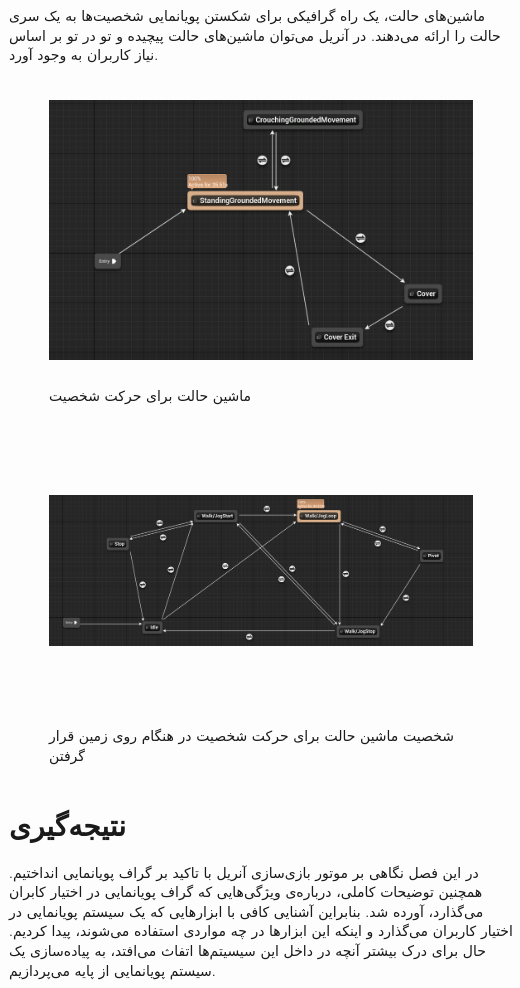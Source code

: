 ماشین‌های حالت، یک راه گرافیکی برای شکستن پویانمایی 
شخصیت‌ها به یک سری حالت را ارائه می‌دهند.
در آنریل می‌توان ماشین‌های حالت پیچیده و تو در تو بر اساس نیاز کاربران به وجود آورد.


\begin{figure}[ht]
	\centerline{\includegraphics[width=\textwidth,height=8cm,keepaspectratio]{Figures/Ch3/AnimationStateMachine1.png}}\hfill
	\caption{ ماشین حالت برای حرکت شخصیت }
	\label{fig:AnimationStateMachine1}
\end{figure}

\begin{figure}[ht]
	\centerline{\includegraphics[width=\textwidth,height=8cm,keepaspectratio]{Figures/Ch3/AnimationStateMachine3.png}}\hfill
	\caption{ شخصیت ماشین حالت برای حرکت شخصیت در هنگام روی زمین قرار گرفتن  }
	\label{fig:AnimationStateMachine3}
\end{figure}

\section{نتیجه‌گیری}

در این فصل نگاهی بر موتور بازی‌سازی آنریل با تاکید بر گراف پویانمایی انداختیم.
همچنین توضیحات کاملی، درباره‌ی ویژگی‌هایی که گراف پویانمایی در اختیار کابران می‌گذارد، آورده شد.
بنابراین آشنایی کافی با ابزار‌هایی که یک سیستم پویانمایی در اختیار کاربران می‌گذارد و 
اینکه این ابزارها در چه مواردی استفاده می‌شوند، پیدا کردیم.
حال برای درک بیشتر آنچه در داخل این سیسیتم‌ها اتفاث می‌افتد، به پیاده‌سازی یک سیستم پویانمایی از پایه می‌پردازیم.




